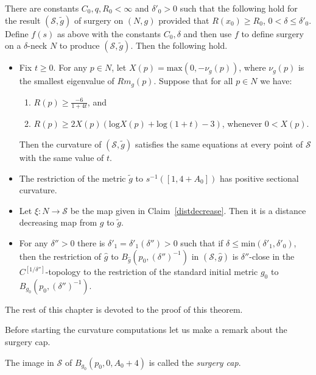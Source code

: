 \begin{theorem}
\label{thm:local-surgery}
\label{LOCALSURGERY}
There are constants $C_0,q,R_0<\infty$ and $\delta'_0>0$ such that the
following hold for the result $({\mathcal S},\widetilde g)$ of surgery on
$(N,g)$ provided that $R(x_0)\ge R_0$, $0<\delta\le \delta'_0$. Define $f(s)$
as above with the constants $C_0,\delta$ and then use $f$ to define surgery on
a $\delta$-neck $N$ to produce $({\mathcal S},\tilde g)$. Then the following
hold.
\begin{itemize}
\item Fix $t\ge 0$. For any $p\in N$,
let $X(p)=\mathrm{max}(0,-\nu_{g}(p))$, where $\nu_ g(p)$ is the
smallest eigenvalue of $Rm_{ g}(p)$. Suppose that for all $p\in N$
we have:
\begin{enumerate}\item[(1)] $R(p)\ge \frac{-6}{1+4t}$, and
\item[(2)] $R(p)\geq 2X(p)\left(\mathrm{log}X(p)+\mathrm{log}(1+t)-3\right)$, whenever $0<X(p)$.
\end{enumerate}
Then the curvature of $({\mathcal S},\widetilde g)$ satisfies the
same equations at every point of ${\mathcal S}$ with the same value
of $t$.
\item The restriction of the metric $\widetilde g$ to $s^{-1}([1,4+A_0])$ has
positive sectional curvature.
\item Let $\xi\colon N\to {\mathcal S}$
be the map given in Claim~\ref{distdecrease}. Then it is a distance
decreasing map from $g$ to $\tilde g$.
\item For any $\delta''>0$ there is $\delta'_1=\delta'_1(\delta'')>0$  such that if
$\delta\le \mathrm{min}(\delta'_1,\delta'_0)$, then  the restriction of
$\hat g$ to $B_{\hat g}(p_0,(\delta'')^{-1})$ in $({\mathcal S},\hat
g)$ is $\delta''$-close in the $C^{[1/\delta'']}$-topology to the
restriction of the standard initial metric $g_0$ to
$B_{g_0}(p_0,(\delta'')^{-1})$.
\end{itemize}
\end{theorem}




The rest of this chapter is devoted to the proof of this theorem.




Before starting the curvature computations let us make a remark about the surgery cap.

\begin{definition}
\label{def:surgery-cap}\label{surgerycap}
The image in ${\mathcal S}$ of $B_{g_0}(p_0,0,A_0+4)$ is called the {\em
surgery cap}.
\end{definition}

